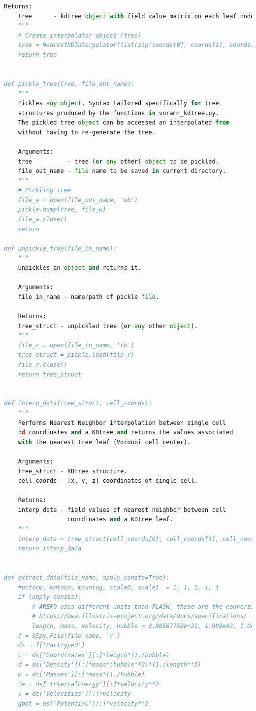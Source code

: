 \documentclass[twoside]{drexel-thesis}
\begin{document}
\begin{lstlisting}[language=python]
    Returns:
    tree      - kdtree object with field value matrix on each leaf node.
    """
    # Create interpolator object (tree)
    tree = NearestNDInterpolator(list(zip(coords[0], coords[1], coords[2])), field_set)
    return tree


def pickle_tree(tree, file_out_name):
    """
    Pickles any object. Syntax tailored specifically for tree
    structures produced by the functions in voramr_kdtree.py.
    The pickled tree object can be accessed an interpolated from
    without having to re-generate the tree.

    Arguments:
    tree          - tree (or any other) object to be pickled.
    file_out_name - file name to be saved in current directory.
    """
    # Pickling tree
    file_w = open(file_out_name, 'wb')
    pickle.dump(tree, file_w)
    file_w.close()
    return

def unpickle_tree(file_in_name):
    """
    Unpickles an object and returns it.

    Arguments:
    file_in_name - name/path of pickle file.

    Returns:    
    tree_struct - unpickled tree (or any other object).
    """
    file_r = open(file_in_name, 'rb')
    tree_struct = pickle.load(file_r)
    file_r.close()
    return tree_struct


def interp_data(tree_struct, cell_coords):
    """
    Performs Nearest Neighbor interpolation between single cell
    3d coordinates and a KDtree and returns the values associated
    with the nearest tree leaf (Voronoi cell center).

    Arguments:
    tree_struct - KDtree structure.
    cell_coords - [x, y, z] coordinates of single cell.

    Returns:
    interp_data - field values of nearest neighbor between cell 
                  coordinates and a KDtree leaf.
    """
    interp_data = tree_struct(cell_coords[0], cell_coords[1], cell_coords[2])
    return interp_data


def extract_data(file_name, apply_consts=True):
    #pctocm, kmtocm, msuntog, scale0, scale1  = 1, 1, 1, 1, 1
    if (apply_consts):
        # AREPO uses different units than FLASH, these are the conversions.
        # https://www.illustris-project.org/data/docs/specifications/
        length, mass, velocity, hubble = 3.08567759e+21, 1.989e43, 1.0e5, 0.7
    f = h5py.File(file_name, 'r')
    ds = f['PartType0']
    c = ds['Coordinates'][:]*length*(1./hubble)
    d = ds['Density'][:]*mass*(hubble**2)*(1./length**3)
    m = ds['Masses'][:]*mass*(1./hubble)
    ie = ds['InternalEnergy'][:]*velocity**2
    v = ds['Velocities'][:]*velocity
    gpot = ds['Potential'][:]*velocity**2
    

\end{lstlisting}
\end{document}
